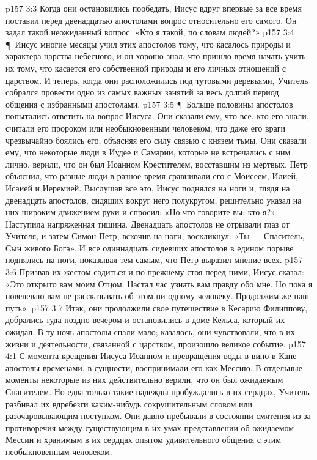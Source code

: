 \vs p157 3:3 Когда они остановились пообедать, Иисус вдруг впервые за все время поставил перед двенадцатью апостолами вопрос относительно его самого. Он задал такой неожиданный вопрос: «Кто я такой, по словам людей?»
\vs p157 3:4 \P\ Иисус многие месяцы учил этих апостолов тому, что касалось природы и характера царства небесного, и он хорошо знал, что пришло время начать учить их тому, что касается его собственной природы и его личных отношений с царством. И теперь, когда они расположились под тутовыми деревьями, Учитель собрался провести одно из самых важных занятий за весь долгий период общения с избранными апостолами.
\vs p157 3:5 \P\ Больше половины апостолов попытались ответить на вопрос Иисуса. Они сказали ему, что все, кто его знали, считали его пророком или необыкновенным человеком; что даже его враги чрезвычайно боялись его, объясняя его силу связью с князем тьмы. Они сказали ему, что некоторые люди в Иудее и Самарии, которые не встречались с ним лично, верили, что он был Иоанном Крестителем, восставшим из мертвых. Петр объяснил, что разные люди в разное время сравнивали его с Моисеем, Илией, Исаией и Иеремией. Выслушав все это, Иисус поднялся на ноги и, глядя на двенадцать апостолов, сидящих вокруг него полукругом, решительно указал на них широким движением руки и спросил: «Но что говорите вы: кто я?» Наступила напряженная тишина. Двенадцать апостолов не отрывали глаз от Учителя, и затем Симон Петр, вскочив на ноги, воскликнул: «Ты --- Спаситель, Сын живого Бога». И все одиннадцать сидевших апостолов в едином порыве поднялись на ноги, показывая тем самым, что Петр выразил мнение всех.
\vs p157 3:6 Призвав их жестом садиться и по\hyp{}прежнему стоя перед ними, Иисус сказал: «Это открыто вам моим Отцом. Настал час узнать вам правду обо мне. Но пока я повелеваю вам не рассказывать об этом ни одному человеку. Продолжим же наш путь».
\vs p157 3:7 Итак, они продолжили свое путешествие в Кесарию Филиппову, добрались туда поздно вечером и остановились в доме Кельса, который их ожидал. В ту ночь апостолы спали мало; казалось, они чувствовали, что в их жизни и деятельности, связанной с царством, произошло великое событие.
\vs p157 4:1 С момента крещения Иисуса Иоанном и превращения воды в вино в Кане апостолы временами, в сущности, воспринимали его как Мессию. В отдельные моменты некоторые из них действительно верили, что он был ожидаемым Спасителем. Но едва только такие надежды пробуждались в их сердцах, Учитель разбивал их вдребезги каким\hyp{}нибудь сокрушительным словом или разочаровывающим поступком. Они давно пребывали в состоянии смятения из\hyp{}за противоречия между существующим в их умах представлении об ожидаемом Мессии и хранимым в их сердцах опытом удивительного общения с этим необыкновенным человеком.
